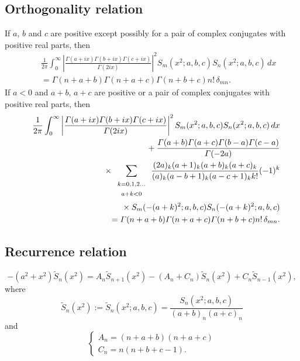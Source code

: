 \documentclass[envcountchap,graybox]{svmono}
\newcommand{\mathindent}{\hspace{7.5mm}}
\renewcommand{\Gamma}{\varGamma}
\begin{document}
\subsection*{Orthogonality relation}
If $a$, $b$ and $c$ are positive except possibly for a pair of complex conjugates with positive real parts, then
\begin{eqnarray}
\label{OrtIContDualHahn}
& &\frac{1}{2\pi}\int_0^{\infty}\left|\frac{\Gamma(a+ix)\Gamma(b+ix)\Gamma(c+ix)}{\Gamma(2ix)}\right|^2
S_m(x^2;a,b,c)S_n(x^2;a,b,c)\,dx\nonumber\\
& &{}=\Gamma(n+a+b)\Gamma(n+a+c)\Gamma(n+b+c)n!\,\delta_{mn}.
\end{eqnarray}
If $a<0$ and $a+b$, $a+c$ are positive or a pair of complex conjugates
with positive real parts, then
\begin{eqnarray}
\label{OrtIIContDualHahn}
& &\frac{1}{2\pi}\int_0^{\infty}\left|\frac{\Gamma(a+ix)\Gamma(b+ix)\Gamma(c+ix)}{\Gamma(2ix)}\right|^2
S_m(x^2;a,b,c)S_n(x^2;a,b,c)\,dx\nonumber\\
& &{}\mathindent{}+\frac{\Gamma(a+b)\Gamma(a+c)\Gamma(b-a)\Gamma(c-a)}{\Gamma(-2a)}\nonumber\\
& &{}\mathindent\mathindent{}\times\sum_{\begin{array}{c}
{\scriptstyle k=0,1,2\ldots}\\{\scriptstyle a+k<0}\end{array}}
\frac{(2a)_k(a+1)_k(a+b)_k(a+c)_k}{(a)_k(a-b+1)_k(a-c+1)_kk!}(-1)^k\nonumber\\
& &{}\mathindent\mathindent\mathindent\mathindent{}\times S_m(-(a+k)^2;a,b,c)S_n(-(a+k)^2;a,b,c)\nonumber\\
& &{}=\Gamma(n+a+b)\Gamma(n+a+c)\Gamma(n+b+c)n!\,\delta_{mn}.
\end{eqnarray}

\subsection*{Recurrence relation}
\begin{equation}
\label{RecContDualHahn}
-\left(a^2+x^2\right){\tilde {S}}_n(x^2)=
A_n{\tilde {S}}_{n+1}(x^2)-\left(A_n+C_n\right){\tilde {S}}_n(x^2)+C_n{\tilde {S}}_{n-1}(x^2),
\end{equation}
where
$${\tilde {S}}_n(x^2):={\tilde {S}}_n(x^2;a,b,c)=\frac{S_n(x^2;a,b,c)}{(a+b)_n(a+c)_n}$$
and
$$\left\{\begin{array}{l}
\displaystyle A_n=(n+a+b)(n+a+c)\\[5mm]
\displaystyle C_n=n(n+b+c-1).
\end{array}\right.$$
\end{document}
